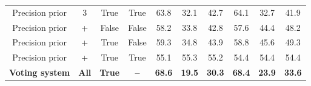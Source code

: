 \begin{table}[h!]
{\begin{tabular}{|c|ccc|ccc|ccc|}
    Precision prior                  & 3                                                                                                    & True                                                                                                      & True                               & 63.8                                 & 32.1                                    & 42.7              & 64.1                                 & 32.7                                    & 41.9              \\
    Precision prior                  & +                                                                                                    & False                                                                                                     & False                              & 58.2                                 & 33.8                                    & 42.8              & 57.6                                 & 44.4                                    & 48.2              \\
    Precision prior                  & +                                                                                                    & True                                                                                                      & False                              & 59.3                                 & 34.8                                    & 43.9              & 58.8                                 & 45.6                                    & 49.3              \\
    Precision prior                  & +                                                                                                    & True                                                                                                      & True                               & 55.1                                 & 55.3                                    & 55.2              & 54.4                                 & 54.4                                    & 54.4              \\ \hline
    \textbf{Voting system}           & \textbf{All}                                                                                         & \textbf{True}                                                                                             & \textbf{--}                        & \textbf{68.6}                        & \textbf{19.5}                           & \textbf{30.3}     & \textbf{68.4}                        & \textbf{23.9}                           & \textbf{33.6}     \\

\end{tabular}}
\end{table}
